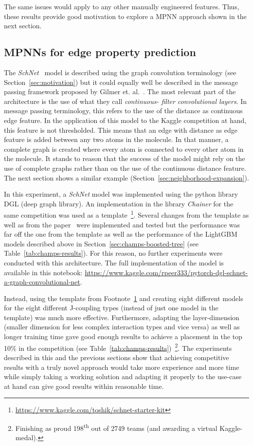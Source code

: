 The same issues would apply to any other manually engineered features. Thus, these results provide good motivation to explore a MPNN approach shown in the next section.


\subsection{MPNNs for edge property prediction}
\label{sec:schnet}

The \textit{SchNet}~\cite{Schutt2017} model is described using the graph convolution terminology (see Section~\ref{sec:motivation}) but it could equally well be described in the message passing framework proposed by Gilmer et. al.~\cite{Gilmer2017}. The most relevant part of the architecture is the use of what they call \textit{continuous- filter convolutional layers}. In message passing terminology, this refers to the use of the distance as continuous edge feature. In the application of this model to the Kaggle competition at hand, this feature is not thresholded. This means that an edge with distance as edge feature is added between any two atoms in the molecule. In that manner, a complete graph is created where every atom is connected to every other atom in the molecule. It stands to reason that the success of the model might rely on the use of complete graphs rather than on the use of the continuous distance feature. The next section shows a similar example (Section~\ref{sec:neighborhood-expansion}).

In this experiment, a \textit{SchNet} model was implemented using the python library DGL (deep graph library). An implementation in the library \textit{Chainer} for the same competition was used as a template~\footnote{\label{fn:chainer-schnet}\url{https://www.kaggle.com/toshik/schnet-starter-kit}}. Several changes from the template as well as from the paper~\cite{Schutt2017} were implemented and tested but the performance was far off the one from the template as well as the performance of the LightGBM models described above in Section~\ref{sec:champs-boosted-tree} (see Table~\ref{tab:champs-results}). For this reason, no further experiments were conducted with this architecture. The full implementation of the model is available in this notebook: \url{https://www.kaggle.com/rpeer333/pytorch-dgl-schnet-a-graph-convolutional-net}.

Instead, using the template from Footnote~\ref{fn:chainer-schnet} and creating eight different models for the eight different J-coupling types (instead of just one model in the template) was much more effective. Furthermore, adapting the layer-dimension (smaller dimension for less complex interaction types and vice versa) as well as longer training time gave good enough results to achieve a placement in the top 10\% in the competition (see Table~\ref{tab:champs-results})~\footnote{Finishing as proud 198\textsuperscript{th} out of 2749 teams (and awarding a virtual Kaggle-medal).}. The experiments described in this and the previous sections show that achieving competitive results with a truly novel approach would take more experience and more time while simply taking a working solution and adapting it properly to the use-case at hand can give good results within reasonable time.


